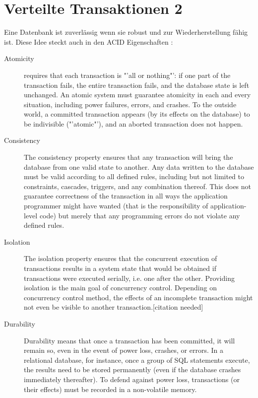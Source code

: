\documentclass[a4paper,10pt,titlepage=false]{scrreprt}
\begin{document}
\chapter{Verteilte Transaktionen 2} %
\label{cha:verteilte_transaktionen_2}

Eine Datenbank ist zuverlässig wenn sie robust und zur Wiederherstellung fähig ist.
Diese Idee steckt auch in den ACID Eigenschaften :
\begin{description}
  \item[Atomicity] requires that each transaction is "'all or nothing"': if one part of the transaction fails, the entire transaction fails, and the database state is left unchanged. An atomic system must guarantee atomicity in each and every situation, including power failures, errors, and crashes. To the outside world, a committed transaction appears (by its effects on the database) to be indivisible ("'atomic"'), and an aborted transaction does not happen.

\item[Consistency] The consistency property ensures that any transaction will bring the database from one valid state to another. Any data written to the database must be valid according to all defined rules, including but not limited to constraints, cascades, triggers, and any combination thereof. This does not guarantee correctness of the transaction in all ways the application programmer might have wanted (that is the responsibility of application-level code) but merely that any programming errors do not violate any defined rules.

\item[Isolation]The isolation property ensures that the concurrent execution of transactions results in a system state that would be obtained if transactions were executed serially, i.e. one after the other. Providing isolation is the main goal of concurrency control. Depending on concurrency control method, the effects of an incomplete transaction might not even be visible to another transaction.[citation needed]

\item[Durability] Durability means that once a transaction has been committed, it will remain so, even in the event of power loss, crashes, or errors. In a relational database, for instance, once a group of SQL statements execute, the results need to be stored permanently (even if the database crashes immediately thereafter). To defend against power loss, transactions (or their effects) must be recorded in a non-volatile memory.
\end{description}
\end{document}
